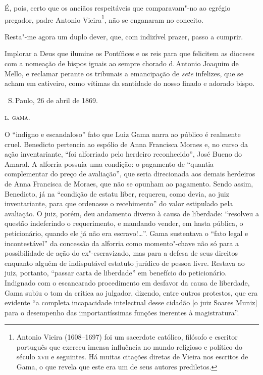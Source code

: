 É, pois, certo que os anciãos respeitáveis que comparavam"-no ao egrégio
pregador, padre Antonio Vieira\footnote{Antonio Vieira (1608--1697) foi
  um sacerdote católico, filósofo e escritor português que exerceu
  imensa influência no mundo religioso e político do século \textsc{xvii} e
  seguintes. Há muitas citações diretas de Vieira nos escritos de Gama,
  o que revela que este era um de seus autores prediletos.},
não se enganaram no conceito.

Resta"-me agora um duplo dever, que, com indizível prazer, passo a
cumprir.

Implorar a Deus que ilumine os Pontífices e os reis para que felicitem
as dioceses com a nomeação de bispos iguais ao sempre chorado d.\,Antonio
Joaquim de Mello, e reclamar perante os tribunais a emancipação de
\emph{sete} infelizes, que se acham em cativeiro, como vítimas da
santidade do nosso finado e adorado bispo.

\medskip

\hfill\ S.\,Paulo, 26 de abril de 1869.\smallskip

\hfill\textsc{l. gama.}

\pagebreak
\mbox{}\vfill
\thispagestyle{empty}

{\small\noindent
O ``indigno e escandaloso'' fato que Luiz Gama narra ao público é
realmente cruel. Benedicto pertencia ao espólio de Anna Francisca Moraes
e, no curso da ação inventariante, ``foi alforriado pelo herdeiro
reconhecido'', José Bueno do Amaral. A alforria possuía uma condição: o
pagamento de ``quantia complementar do preço de avaliação'', que seria
direcionada aos demais herdeiros de Anna Francisca de Moraes, que não se
opunham ao pagamento. Sendo assim, Benedicto, já na ``condição de estatu
liber, requereu, como devia, ao juiz inventariante, para que ordenasse o
recebimento'' do valor estipulado pela avaliação. O juiz, porém, deu
andamento diverso à causa de liberdade: ``resolveu a questão indeferindo
o requerimento, e mandando vender, em hasta pública, o peticionário,
quando ele já não era escravo!\ldots{}''. Gama sustentava o ``fato legal e
incontestável'' da concessão da alforria como momento"-chave não só para a
possibilidade de ação do ex"-escravizado, mas para a defesa de seus
direitos enquanto alguém de indisputável estatuto jurídico de pessoa
livre. Restava ao juiz, portanto, ``passar carta de liberdade'' em
benefício do peticionário. Indignado com o escancarado procedimento em
desfavor da causa de liberdade, Gama subiu o tom da crítica ao julgador,
dizendo, entre outros protestos, que era evidente ``a completa
incapacidade intelectual desse cidadão {[}o juiz Soares Muniz{]} para o
desempenho das importantíssimas funções inerentes à magistratura''.}

